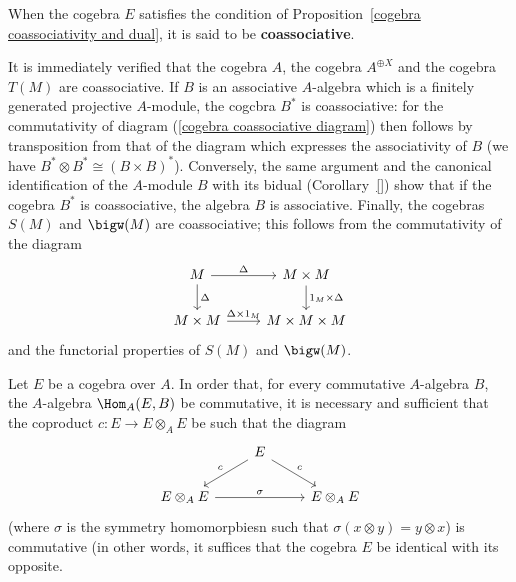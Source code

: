 When the cogebra $E$ satisfies the condition of Proposition~\ref{cogebra coassociativity and dual}, it is said to be \textbf{coassociative}.
\begin{example}
It is immediately verified that the cogebra $A$, the cogebra $A^{\oplus X}$ and the cogebra $T(M)$ are coassociative. If $B$ is an associative $A$-algebra which is a finitely generated projective $A$-module, the cogcbra $B^*$ is coassociative: for the commutativity of diagram (\ref{cogebra coassociative diagram}) then follows by transposition from that of the diagram which expresses the associativity of $B$ (we have $B^*\otimes B^*\cong(B\times B)^*$). Conversely, the same argument and the canonical identification of the $A$-module $B$ with its bidual (Corollary~\ref{}) show that if the cogebra $B^*$ is coassociative, the algebra $B$ is associative. Finally, the cogebras $S(M)$ and $\bigw(M)$ are coassociative; this follows from the commutativity of the diagram
\[\begin{tikzcd}
M\ar[r,"\Delta"]\ar[d,"\Delta"]&M\times M\ar[d,"1_M\times\Delta"]\\
M\times M\ar[r,"\Delta\times 1_M"]&M\times M\times M
\end{tikzcd}\]
and the functorial properties of $S(M)$ and $\bigw(M)$.
\end{example}
\begin{proposition}\label{cogebra cocommutativity and opposite}
Let $E$ be a cogebra over $A$. In order that, for every commutative $A$-algebra $B$, the $A$-algebra $\Hom_A(E,B)$ be commutative, it is necessary and sufficient that the coproduct $c:E\to E\otimes_AE$ be such that the diagram
\begin{equation}\label{cogebra cocommutativity diagram}
\begin{tikzcd}
&E\ar[ld,swap,"c"]\ar[rd,"c"]&\\
E\otimes_AE\ar[rr,"\sigma"]&&E\otimes_AE
\end{tikzcd}
\end{equation}
(where $\sigma$ is the symmetry homomorpbiesn such that $\sigma(x\otimes y)=y\otimes x$) is commutative (in other words, it suffices that the cogebra $E$ be identical with its opposite.
\end{proposition}
